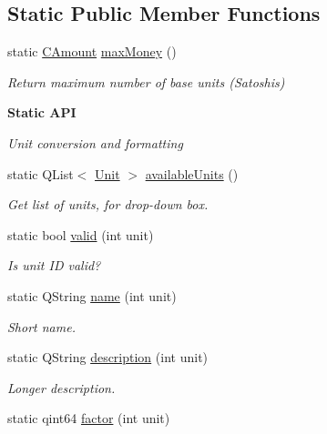 \subsection*{Static Public Member Functions}
\begin{DoxyCompactItemize}
\item 
static \hyperlink{amount_8h_a4eaf3a5239714d8c45b851527f7cb564}{C\+Amount} \hyperlink{class_dark_silk_units_a03b1019d3dd549bc9a0f6d9cf5040723}{max\+Money} ()
\begin{DoxyCompactList}\small\item\em Return maximum number of base units (Satoshis) \end{DoxyCompactList}\end{DoxyCompactItemize}
\begin{Indent}{\bf Static A\+P\+I}\par
{\em Unit conversion and formatting }\begin{DoxyCompactItemize}
\item 
static Q\+List$<$ \hyperlink{class_dark_silk_units_a588cf5f654ad4aa646647ffde0031482}{Unit} $>$ \hyperlink{class_dark_silk_units_acf4eea1e4c6f892f1299a2cb06094e62}{available\+Units} ()
\begin{DoxyCompactList}\small\item\em Get list of units, for drop-\/down box. \end{DoxyCompactList}\item 
static bool \hyperlink{class_dark_silk_units_a2ed8a06dc0be53d55c5207bf03987472}{valid} (int unit)
\begin{DoxyCompactList}\small\item\em Is unit I\+D valid? \end{DoxyCompactList}\item 
static Q\+String \hyperlink{class_dark_silk_units_aa63c8fe61b199e769730bc6ec9db8ba6}{name} (int unit)
\begin{DoxyCompactList}\small\item\em Short name. \end{DoxyCompactList}\item 
static Q\+String \hyperlink{class_dark_silk_units_a564c452e880f63b37bbebc0e21dc2179}{description} (int unit)
\begin{DoxyCompactList}\small\item\em Longer description. \end{DoxyCompactList}\item 
static qint64 \hyperlink{class_dark_silk_units_a3cc1f09aeee8437c40650ce9d460ec4d}{factor} (int unit)

\end{DoxyCompactItemize}
\end{Indent}
